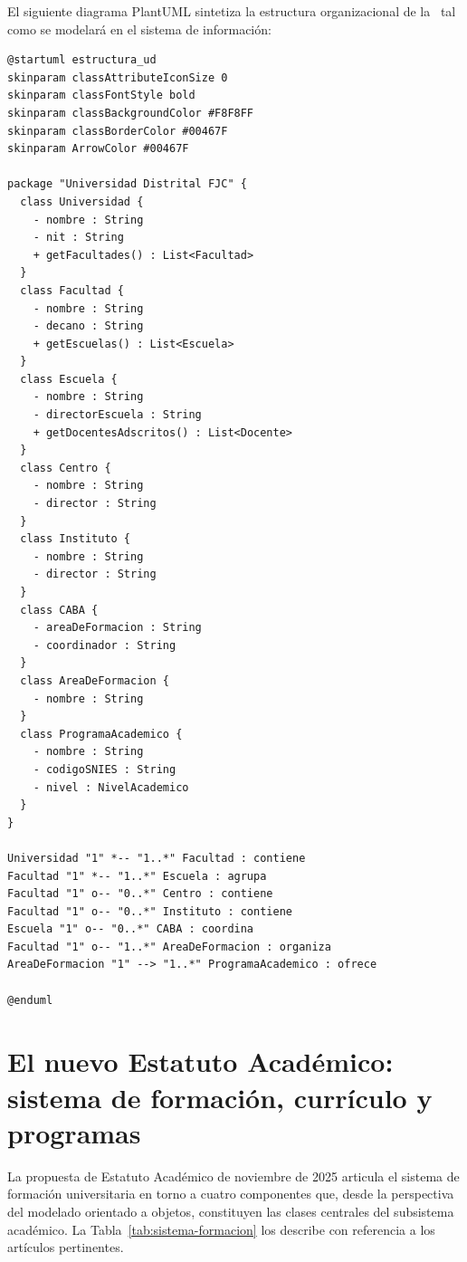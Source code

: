 \noindent
El siguiente diagrama PlantUML sintetiza la estructura organizacional
de la \ud\ tal como se modelará en el sistema de información:

\begin{lstlisting}[style=plantumlStyle,
  caption={Diagrama de estructura organizacional de la \ud\ (PlantUML).},
  label={lst:plantuml-org}]
@startuml estructura_ud
skinparam classAttributeIconSize 0
skinparam classFontStyle bold
skinparam classBackgroundColor #F8F8FF
skinparam classBorderColor #00467F
skinparam ArrowColor #00467F

package "Universidad Distrital FJC" {
  class Universidad {
    - nombre : String
    - nit : String
    + getFacultades() : List<Facultad>
  }
  class Facultad {
    - nombre : String
    - decano : String
    + getEscuelas() : List<Escuela>
  }
  class Escuela {
    - nombre : String
    - directorEscuela : String
    + getDocentesAdscritos() : List<Docente>
  }
  class Centro {
    - nombre : String
    - director : String
  }
  class Instituto {
    - nombre : String
    - director : String
  }
  class CABA {
    - areaDeFormacion : String
    - coordinador : String
  }
  class AreaDeFormacion {
    - nombre : String
  }
  class ProgramaAcademico {
    - nombre : String
    - codigoSNIES : String
    - nivel : NivelAcademico
  }
}

Universidad "1" *-- "1..*" Facultad : contiene
Facultad "1" *-- "1..*" Escuela : agrupa
Facultad "1" o-- "0..*" Centro : contiene
Facultad "1" o-- "0..*" Instituto : contiene
Escuela "1" o-- "0..*" CABA : coordina
Facultad "1" o-- "1..*" AreaDeFormacion : organiza
AreaDeFormacion "1" --> "1..*" ProgramaAcademico : ofrece

@enduml
\end{lstlisting}

\section{El nuevo Estatuto Académico: sistema de formación,
  currículo y programas}
\label{sec:estatuto-academico}

La propuesta de Estatuto Académico de noviembre de 2025 articula el sistema
de formación universitaria en torno a cuatro componentes que, desde la
perspectiva del modelado orientado a objetos, constituyen las clases
centrales del subsistema académico. La Tabla~\ref{tab:sistema-formacion}
los describe con referencia a los artículos pertinentes.

